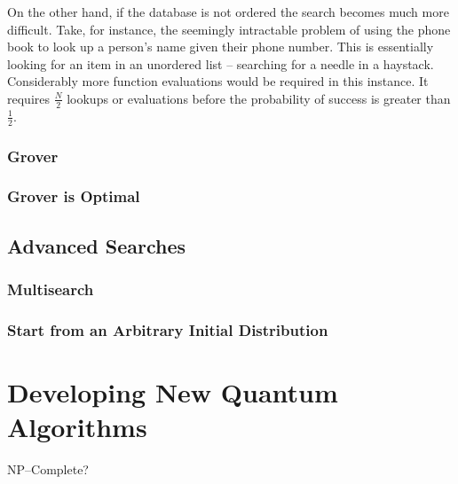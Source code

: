 On the other hand, if the database is not ordered the search
becomes much more difficult.  Take, for instance, the seemingly
intractable problem of using the phone book to look up a 
person's name given their phone number.  This is essentially
looking for an item in an unordered list -- searching for a 
needle in a haystack.  Considerably more function evaluations
would be required in this instance.  It requires $\frac{N}{2}$
lookups or evaluations before the probability of success is 
greater than $\frac{1}{2}$.


\subsubsection{Grover}


\subsubsection{Grover is Optimal}


\subsection{Advanced Searches}

\subsubsection{Multisearch}

\subsubsection{Start from an Arbitrary Initial Distribution}


\section{Developing New Quantum Algorithms}

NP--Complete?
